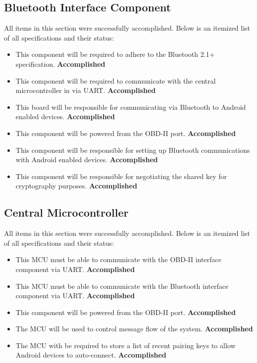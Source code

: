 \documentclass[12pt,letterpaper]{article}
\begin{document}
\subsection{Bluetooth Interface Component}
All items in this section were successfully accomplished. Below is an itemized list of all specifications and their status:

\begin{itemize}
	\item This component will be required to adhere to the Bluetooth 2.1+ specification. \textbf{Accomplished}
	\item This component will be required to communicate with the central microcontroller in via UART. \textbf{Accomplished}
	\item This board will be responsible for communicating via Bluetooth to Android enabled devices. \textbf{Accomplished}
	\item This component will be powered from the OBD-II port. \textbf{Accomplished}
	\item This component will be responsible for setting up Bluetooth communications with Android enabled devices. \textbf{Accomplished}
	\item This component will be responsible for negotiating the shared key for cryptography purposes. \textbf{Accomplished}
\end{itemize}

\subsection{Central Microcontroller}
All items in this section were successfully accomplished. Below is an itemized list of all specifications and their status: 

\begin{itemize}
	\item This MCU must be able to communicate with the OBD-II interface component via UART. \textbf{Accomplished}
	\item This MCU must be able to communicate with the Bluetooth interface component via UART. \textbf{Accomplished}
	\item This component will be powered from the OBD-II port. \textbf{Accomplished}
	\item The MCU will be used to control message flow of the system. \textbf{Accomplished}
	\item The MCU with be required to store a list of recent pairing keys to allow Android devices to auto-connect. \textbf{Accomplished}
\end{itemize} 
\end{document}
